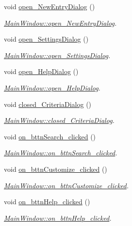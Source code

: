 \begin{DoxyCompactItemize}
\item 
void \hyperlink{class_main_window_a551fc22af0005edc3b4cc0c53ea820de}{open\+\_\+\+New\+Entry\+Dialog} ()
\begin{DoxyCompactList}\small\item\em \hyperlink{class_main_window_a551fc22af0005edc3b4cc0c53ea820de}{Main\+Window\+::open\+\_\+\+New\+Entry\+Dialog}. \end{DoxyCompactList}\item 
void \hyperlink{class_main_window_a403913bc8bd6e666254eefbcd41117ee}{open\+\_\+\+Settings\+Dialog} ()
\begin{DoxyCompactList}\small\item\em \hyperlink{class_main_window_a403913bc8bd6e666254eefbcd41117ee}{Main\+Window\+::open\+\_\+\+Settings\+Dialog}. \end{DoxyCompactList}\item 
void \hyperlink{class_main_window_a693c218a2b0914b96d567c46a06c32d4}{open\+\_\+\+Help\+Dialog} ()
\begin{DoxyCompactList}\small\item\em \hyperlink{class_main_window_a693c218a2b0914b96d567c46a06c32d4}{Main\+Window\+::open\+\_\+\+Help\+Dialog}. \end{DoxyCompactList}\item 
void \hyperlink{class_main_window_a097083ebf975108934ad8d9c6fdd3f3f}{closed\+\_\+\+Criteria\+Dialog} ()
\begin{DoxyCompactList}\small\item\em \hyperlink{class_main_window_a097083ebf975108934ad8d9c6fdd3f3f}{Main\+Window\+::closed\+\_\+\+Criteria\+Dialog}. \end{DoxyCompactList}\item 
void \hyperlink{class_main_window_a32b2923a323e16dc60261ce4cfe60d65}{on\+\_\+bttn\+Search\+\_\+clicked} ()
\begin{DoxyCompactList}\small\item\em \hyperlink{class_main_window_a32b2923a323e16dc60261ce4cfe60d65}{Main\+Window\+::on\+\_\+bttn\+Search\+\_\+clicked}. \end{DoxyCompactList}\item 
void \hyperlink{class_main_window_a12c4c94f2496fad333abb9b12d898e7f}{on\+\_\+bttn\+Customize\+\_\+clicked} ()
\begin{DoxyCompactList}\small\item\em \hyperlink{class_main_window_a12c4c94f2496fad333abb9b12d898e7f}{Main\+Window\+::on\+\_\+bttn\+Customize\+\_\+clicked}. \end{DoxyCompactList}\item 
void \hyperlink{class_main_window_a60e4beac3c41c2d495afa5e07fc32041}{on\+\_\+bttn\+Help\+\_\+clicked} ()
\begin{DoxyCompactList}\small\item\em \hyperlink{class_main_window_a60e4beac3c41c2d495afa5e07fc32041}{Main\+Window\+::on\+\_\+bttn\+Help\+\_\+clicked}. \end{DoxyCompactList}\end{DoxyCompactItemize}
